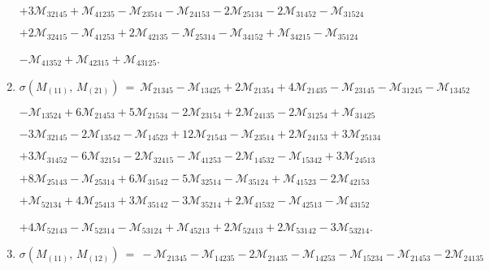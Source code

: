 \documentclass[12pt]{article}
\newcommand{\M}{\mathcal{M}}
\begin{document}
\begin{enumerate}
      \hspace{10pt}
      $+3\M_{32145} 
       +\M_{41235} -\M_{23514} 
       -\M_{24153} -2\M_{25134} 
       -2\M_{31452} -\M_{31524} $\vspace{-6pt}

      \hspace{10pt}
      $+2\M_{32415} -\M_{41253} 
       +2\M_{42135} -\M_{25314} 
       -\M_{34152} +\M_{34215} 
       -\M_{35124} $\vspace{-6pt}

      \hspace{10pt}
      $-\M_{41352} 
       +\M_{42315} +\M_{43125} $.\vspace{-8pt}
\item[]\hspace{-50pt}$\sigma(M_{(11)},\,M_{(21)})\ =\ 
        \M_{21345} -\M_{13425} 
       +2\M_{21354} +4\M_{21435} 
       -\M_{23145} -\M_{31245} 
       -\M_{13452} $\vspace{-6pt}

      \hspace{10pt}
      $-\M_{13524} 
       +6\M_{21453} +5\M_{21534} 
       -2\M_{23154} +2\M_{24135} 
       -2\M_{31254} +\M_{31425} $\vspace{-6pt}

      \hspace{10pt}
      $-3\M_{32145} -2\M_{13542} 
       -\M_{14523} +12\M_{21543} 
       -\M_{23514} +2\M_{24153} 
       +3\M_{25134} $\vspace{-6pt}

      \hspace{10pt}
      $+3\M_{31452} 
       -6\M_{32154} -2\M_{32415} 
       -\M_{41253} -2\M_{14532} 
       -\M_{15342} +3\M_{24513} $\vspace{-6pt}

      \hspace{10pt}
      $+8\M_{25143} -\M_{25314} 
       +6\M_{31542} -5\M_{32514} 
       -\M_{35124} +\M_{41523} 
       -2\M_{42153} $\vspace{-6pt}

      \hspace{10pt}
      $+\M_{52134} 
       +4\M_{25413} +3\M_{35142} 
       -3\M_{35214} +2\M_{41532} 
       -\M_{42513} -\M_{43152} $\vspace{-6pt}

      \hspace{10pt}
      $+4\M_{52143} -\M_{52314} 
       -\M_{53124} +\M_{45213} 
       +2\M_{52413} +2\M_{53142} 
       -3\M_{53214} $.\vspace{-8pt}
\item[]\hspace{-50pt}$\sigma(M_{(11)},\,M_{(12)})\ =\ 
        -\M_{21345} -\M_{14235} 
       -2\M_{21435} -\M_{14253} 
       -\M_{15234} -\M_{21453} 
       -2\M_{24135} $\vspace{-6pt}


\end{enumerate}
\end{document}
